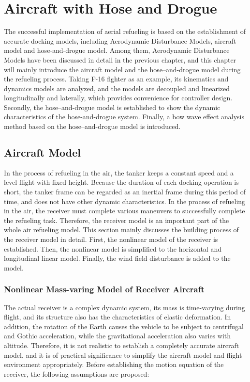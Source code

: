 
\chapter{Aircraft with Hose and Drogue}

	The successful implementation of aerial refueling is based on the establishment of accurate docking models, including Aerodynamic Disturbance Models, aircraft model and hose-and-drogue model. Among them, Aerodynamic Disturbance Models have been discussed in detail in the previous chapter, and this chapter will mainly introduce the aircraft model and the hose–and-drogue model during the refueling process. Taking F-16 fighter as an example, its kinematics and dynamics models are analyzed, and the models are decoupled and linearized longitudinally and laterally, which provides convenience for controller design. Secondly, the hose–and-drogue model is established to show the dynamic characteristics of the hose-and-drogue system. Finally, a bow wave effect analysis method based on the hose–and-drogue model is introduced. 

\section{Aircraft Model}

In the process of refueling in the air, the tanker keeps a constant speed and a level flight with fixed height. Because the duration of each docking operation is short, the tanker frame can be regarded as an inertial frame during this period of time, and does not have other dynamic characteristics. In the process of refueling in the air, the receiver must complete various maneuvers to successfully complete the refueling task. Therefore, the receiver model is an important part of the whole air refueling model. This section mainly discusses the building process of the receiver model in detail. First, the nonlinear model of the receiver is established. Then, the nonlinear model is simplified to the horizontal and longitudinal linear model. Finally, the wind field disturbance is added to the model.

\subsection{Nonlinear Mass-varing Model of Receiver Aircraft }
The actual receiver is a complex dynamic system, its mass is time-varying during flight, and its structure also has the characteristics of elastic deformation. In addition, the rotation of the Earth causes the vehicle to be subject to centrifugal and Gothic acceleration, while the gravitational acceleration also varies with altitude. Therefore, it is not realistic to establish a completely accurate aircraft model, and it is of practical significance to simplify the aircraft model and flight environment appropriately. Before establishing the motion equation of the receiver, the following assumptions are proposed:


